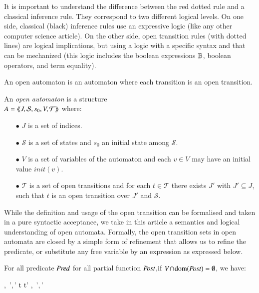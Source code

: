 \documentclass{elsarticle}
\makeatletter
\newcommand{\raisemath}[1]{\mathpalette{\raisem@th{#1}}}
\newcommand{\raisem@th}[3]{\raisebox{#1}{$#2#3$}}
\newcommand{\shortodot}{\!\odot\!}
\makeatother
\begin{document}
It is important to understand the difference between the red dotted rule and a classical 
inference rule. They correspond to two different logical levels.
On one side, classical (black) inference rules  use  an expressive logic (like any other computer science article).
 On the other side, open transition rules (with dotted lines) are logical implications, but using a  logic with a specific syntax and that can be mechanized (this logic includes the boolean expressions $\mathbb{B}$, boolean operators, and term equality).


An open automaton is  an automaton where each transition is an open transition.
\begin{definition}
	\label{def:open-automaton}
	An \emph{open automaton} is a structure\\ $A =
	\langle\hspace{-0.45ex}\langle J,\mathcal{S},s_0,V,\mathcal{T}\rangle\hspace{-0.45ex}\rangle$ where:
	\begin{itemize}
		\item[$\bullet$]   $J$ is a  set of indices.
		\item[$\bullet$]   $\mathcal{S}$ is a set of states and $s_0$ an initial state
		  among $\mathcal{S}$.
 \item[$\bullet$] $V$ is a set of variables of the automaton
		and each $v\in V$ may have an initial value $init(v)$.
		\item[$\bullet$] $\mathcal{T}$ is a set of open transitions and for each
		$t\in \mathcal{T}$ there exists  $J'$ with  $J'
		\subseteq J$, such that $t$ is an open transition over  $J'$
		and  $\mathcal{S}$.
		
	\end{itemize}

While the definition and usage of the open transition can be formalised and taken in a pure syntactic acceptance, we take in this article a semantics and logical understanding of open automata. 
Formally, the open transition sets in open automata are closed by a simple form of refinement that
allows us to refine the predicate, or substitute any free variable by
an expression as expressed below.

For all predicate $\Pred$ for all partial function $\Post$,if $V\!\cap \!\dom(\Post)=\emptyset$, we have: 
		 \begin{mathpar}
    \openrule
         {
           \set{\beta}, \Pred\,',\Post\,'}
          {t \OTarrow {\alpha} t'}\in{}
\quad\implies\quad
    \openrule
         {
           \set{\beta}\subst{\Post}, \Pred\,'\subst{\Post}\land\Pred,\Post\shortodot\Post\,'}
         {\raisemath{-2pt}{t \OTarrow {\alpha\subst{\Post}} {t'}}{}}
 \in{}
\end{mathpar}
\end{definition}
\end{document}
